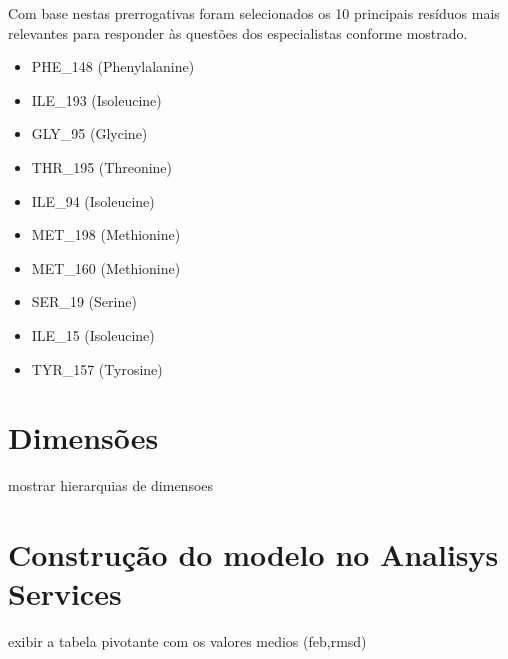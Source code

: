 Com base nestas prerrogativas foram selecionados os 10 principais resíduos mais relevantes para responder às questões dos especialistas conforme mostrado.

\begin{itemize}
	\item PHE\_148 (Phenylalanine)
	\item ILE\_193 (Isoleucine)
	\item GLY\_95 (Glycine)
	\item THR\_195 (Threonine)
	\item ILE\_94 (Isoleucine)
	\item MET\_198 (Methionine)
	\item MET\_160 (Methionine)
	\item SER\_19 (Serine)
	\item ILE\_15 (Isoleucine)
	\item TYR\_157 (Tyrosine)
\end{itemize}



\section{Dimensões}
	mostrar hierarquias de dimensoes
	
\section{Construção do modelo no Analisys Services}
	exibir a tabela pivotante com os valores medios (feb,rmsd)

